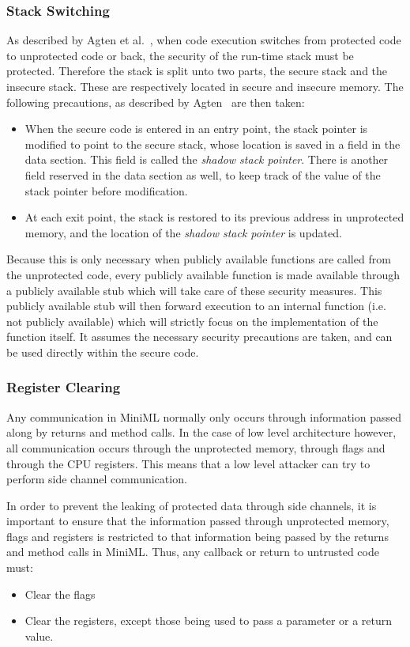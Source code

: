 \subsubsection{Stack Switching}
As described by Agten et al.~\cite{Agten:2012:SCM:2354412.2355247}, when code execution switches from protected code to unprotected code or back, the security of the run-time stack must be protected.
Therefore the stack is split unto two parts, the secure stack and the insecure stack.
These are respectively located in secure and insecure memory.
The following precautions, as described by Agten~\cite{Agten:2012:SCM:2354412.2355247} are then taken:
\begin{itemize}
\item When the secure code is entered in an entry point, the stack pointer is modified to point to the secure stack, whose location is saved in a field in the data section.
This field is called the \emph{shadow stack pointer}.
There is another field reserved in the data section as well, to keep track of the value of the stack pointer before modification.
\item At each exit point, the stack is restored to its previous
address in unprotected memory, and the location of the \emph{shadow stack pointer} is updated.
\end{itemize}

Because this is only necessary when publicly available functions are called from the unprotected code, every publicly available function is made available through a publicly available stub which will take care of these security measures.
This publicly available stub will then forward execution to an internal function (i.e. not publicly available) which will strictly focus on the implementation of the function itself.
It assumes the necessary security precautions are taken, and can be used directly within the secure code.

\subsubsection{Register Clearing}
Any communication in \mbox{MiniML} normally only occurs through information passed along by returns and method calls.
In the case of low level architecture however, all communication occurs through the unprotected memory, through flags and through the CPU registers.
This means that a low level attacker can try to perform side channel communication.

In order to prevent the leaking of protected data through side channels, it is important to ensure that the information passed through unprotected memory, flags and registers is restricted to that information being passed by the returns and method calls in \mbox{MiniML}.
Thus, any callback or return to untrusted code must\cite{Agten:2012:SCM:2354412.2355247}:
\begin{itemize}
\item Clear the flags
\item Clear the registers, except those being used to pass a parameter or a return value.
\end{itemize}

